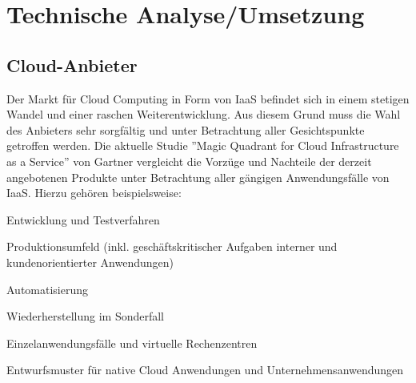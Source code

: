 \documentclass[13pt,a4paper,bibliography=totocnumbered,listof=totocnumbered]{scrartcl}
\begin{document}
\section{Technische Analyse/Umsetzung}\label{UmsetzungV}

\subsection{Cloud-Anbieter}
Der Markt für Cloud Computing in Form von IaaS befindet sich in einem stetigen Wandel und einer raschen Weiterentwicklung. Aus diesem Grund muss die Wahl des Anbieters sehr sorgfältig und unter Betrachtung aller Gesichtspunkte getroffen werden. Die aktuelle Studie ''Magic Quadrant for Cloud Infrastructure as a Service'' von Gartner \cite{30} vergleicht die Vorzüge und Nachteile der derzeit angebotenen Produkte unter Betrachtung aller gängigen Anwendungsfälle von IaaS. Hierzu gehören beispielsweise:
\begin{compactitem}
	\item Entwicklung und Testverfahren
	\item Produktionsumfeld (inkl. geschäftskritischer Aufgaben interner und kundenorientierter Anwendungen)
	\item Automatisierung
	\item Wiederherstellung im Sonderfall
	\item Einzelanwendungsfälle und virtuelle Rechenzentren
	\item Entwurfsmuster für native Cloud Anwendungen und Unternehmensanwendungen
\end{compactitem}
\end{document}
